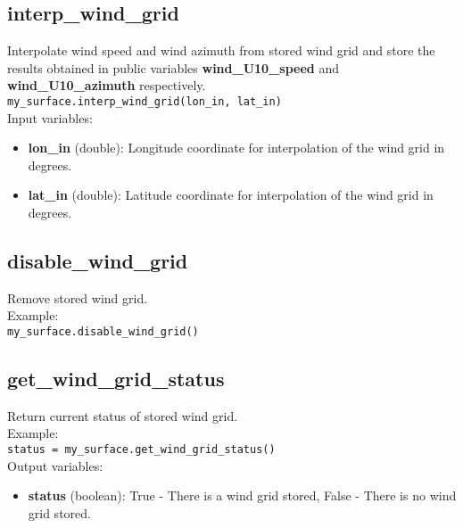 \subsection{interp\_wind\_grid}

Interpolate wind speed and wind azimuth from stored wind grid and store the results obtained in public variables {\bf wind\_U10\_speed} and {\bf wind\_U10\_azimuth} respectively.\\

\texttt{my\_surface.interp\_wind\_grid(lon\_in, lat\_in)}\\

Input variables:
\begin{itemize}
\item {\bf lon\_in} (double): Longitude coordinate for interpolation of the wind grid in degrees.
\item {\bf lat\_in} (double): Latitude coordinate for interpolation of the wind grid in degrees.
\end{itemize}


\subsection{disable\_wind\_grid}

Remove stored wind grid.\\

Example:\\

\texttt{my\_surface.disable\_wind\_grid()}\\


\subsection{get\_wind\_grid\_status}

Return current status of stored wind grid.\\

Example:\\

\texttt{status = my\_surface.get\_wind\_grid\_status()}\\

Output variables:
\begin{itemize}
\item {\bf status} (boolean): True - There is a wind grid stored, False - There is no wind grid stored.
\end{itemize}

